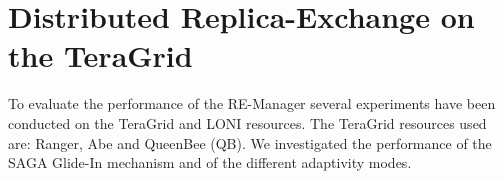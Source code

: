 \documentclass{rspublic}
\newcommand{\replicaagent}[1]{Replica-Agent }
\begin{document}
% 
% 
% 
% 





\section{Distributed Replica-Exchange on the TeraGrid}
\label{sec:exp}
        
To evaluate the performance of the RE-Manager several experiments have
been conducted on the TeraGrid and LONI resources. The TeraGrid
resources used are: Ranger, Abe and QueenBee (QB).  We investigated
the performance of the SAGA Glide-In mechanism and of the different
adaptivity modes.
\end{document}
